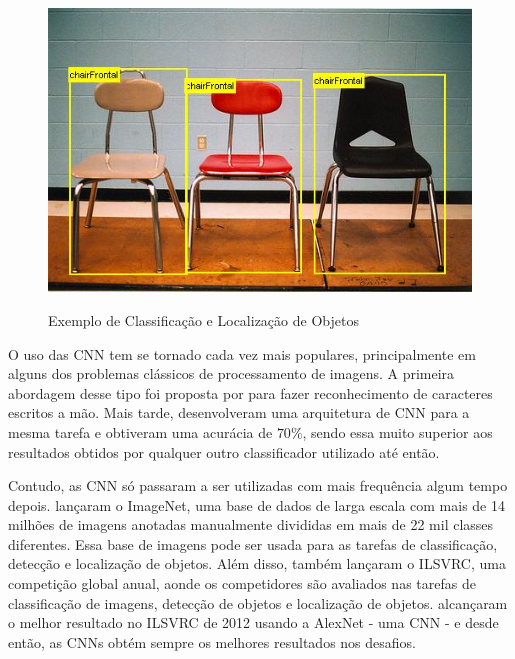   \begin{figure}[t!]
  \setlength{\abovecaptionskip}{0pt}
  \setlength{\belowcaptionskip}{0pt}
  \caption[Exemplo de Classificação e Localização]{Exemplo de Classificação e Localização de Objetos}
  \centering
  \includegraphics[width=.9\textwidth]{imagem/0x_classdetec.jpg}
  \captionsetup{justification=centering}
  \label{fig:exemploclassdet}
  \end{figure}

O uso das \ac{CNN} tem se tornado cada vez mais populares, principalmente em alguns dos problemas clássicos de processamento de imagens. A primeira abordagem desse tipo foi proposta por  para fazer reconhecimento de caracteres escritos a mão. Mais tarde,  desenvolveram uma arquitetura de \ac{CNN} para a mesma tarefa e obtiveram uma acurácia de $70\%$, sendo essa muito superior aos resultados obtidos por qualquer outro classificador utilizado até então.

Contudo, as \ac{CNN} só passaram a ser utilizadas com mais frequência algum tempo depois.  lançaram o ImageNet, uma base de dados de larga escala com mais de 14 milhões de imagens anotadas manualmente divididas em mais de 22 mil classes diferentes. Essa base de imagens pode ser usada para as tarefas de classificação, detecção e localização de objetos. Além disso,  também lançaram o \ac{ILSVRC}, uma competição global anual, aonde os competidores são avaliados nas tarefas de classificação de imagens, detecção de objetos e localização de objetos.  alcançaram o melhor resultado no \ac{ILSVRC} de 2012 usando a AlexNet - uma \ac{CNN} - e desde então, as \ac{CNN}s obtém sempre os melhores resultados nos desafios.

